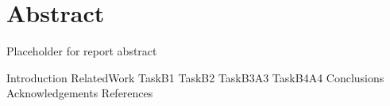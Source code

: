 \chapter{Abstract}
Placeholder for report abstract

{Introduction}
{RelatedWork}
{TaskB1}
{TaskB2}
{TaskB3A3}
{TaskB4A4}
{Conclusions}
{Acknowledgements}
{References}
